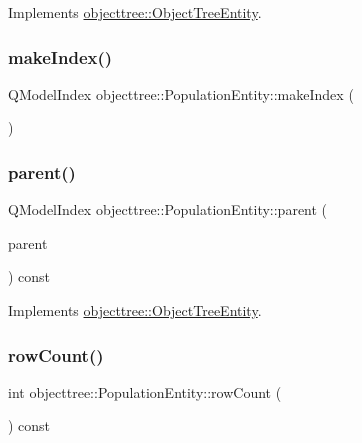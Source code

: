 Implements \mbox{\hyperlink{classobjecttree_1_1_object_tree_entity_a9ccaab3b27e65b1ed8b22f00c57a1082}{objecttree\+::\+Object\+Tree\+Entity}}.

\mbox{\label{classobjecttree_1_1_population_entity_ad15c8a5d3ea897832b47036f51a4b5bd}} 
\subsubsection{\texorpdfstring{makeIndex()}{makeIndex()}}
{\footnotesize\ttfamily Q\+Model\+Index objecttree\+::\+Population\+Entity\+::make\+Index (\begin{DoxyParamCaption}{ }\end{DoxyParamCaption})}

\mbox{\label{classobjecttree_1_1_population_entity_a1b9bbc71a7630b2b441f94bbf2725810}} 
\subsubsection{\texorpdfstring{parent()}{parent()}}
{\footnotesize\ttfamily Q\+Model\+Index objecttree\+::\+Population\+Entity\+::parent (\begin{DoxyParamCaption}\item[{const Q\+Model\+Index \&}]{parent }\end{DoxyParamCaption}) const\hspace{0.3cm}{\ttfamily [virtual]}}



Implements \mbox{\hyperlink{classobjecttree_1_1_object_tree_entity_a2d1b13c056476f87637aacd7e99e7305}{objecttree\+::\+Object\+Tree\+Entity}}.

\mbox{\label{classobjecttree_1_1_population_entity_a3701a9792edfaf28e1273f6cd2357b37}} 
\subsubsection{\texorpdfstring{rowCount()}{rowCount()}}
{\footnotesize\ttfamily int objecttree\+::\+Population\+Entity\+::row\+Count (\begin{DoxyParamCaption}{ }\end{DoxyParamCaption}) const\hspace{0.3cm}{\ttfamily [virtual]}}



